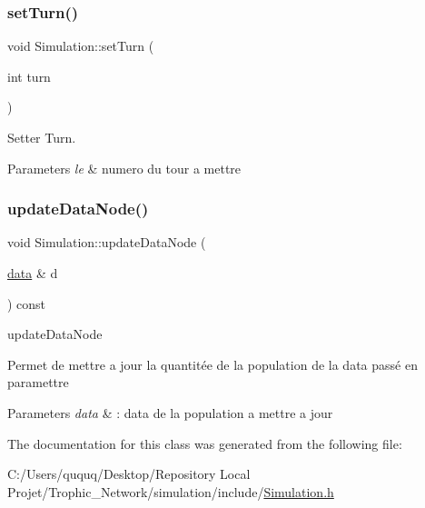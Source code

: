 \subsubsection{\texorpdfstring{set\+Turn()}{setTurn()}}
{\footnotesize\ttfamily void Simulation\+::set\+Turn (\begin{DoxyParamCaption}\item[{int}]{turn }\end{DoxyParamCaption})}



Setter Turn. 


\begin{DoxyParams}{Parameters}
{\em le} & numero du tour a mettre \\
\hline
\end{DoxyParams}
\mbox{\label{class_simulation_aef637346a3cf4fc4c5f807f2b5bbae61}} 
\subsubsection{\texorpdfstring{update\+Data\+Node()}{updateDataNode()}}
{\footnotesize\ttfamily void Simulation\+::update\+Data\+Node (\begin{DoxyParamCaption}\item[{\mbox{\hyperlink{_graph_8h_a98cbe1f79429fc62806b32b6e8871d9e}{data}} \&}]{d }\end{DoxyParamCaption}) const}



update\+Data\+Node 

Permet de mettre a jour la quantitée de la population de la data passé en paramettre


\begin{DoxyParams}{Parameters}
{\em data} & \+: data de la population a mettre a jour \\
\hline
\end{DoxyParams}


The documentation for this class was generated from the following file\+:\begin{DoxyCompactItemize}
\item 
C\+:/\+Users/ququq/\+Desktop/\+Repository Local Projet/\+Trophic\+\_\+\+Network/simulation/include/\mbox{\hyperlink{_simulation_8h}{Simulation.\+h}}\end{DoxyCompactItemize}
